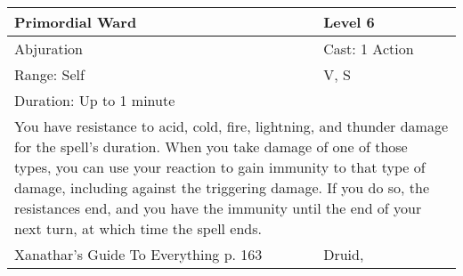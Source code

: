 \documentclass[11pt]{report}
\begin{document}
\begin{table}[H]
	\begin{tabular}{||p{6cm}|p{6cm}||}
		\hline\hline
		\bf{Primordial Ward} & Level 6\\ \hline
		Abjuration & Cast: 1 Action\\ \hline
		Range: Self & V, S\\ \hline
		Duration: Up to 1 minute & \\ \hline
		\multicolumn{2}{||p{12cm}||}{You have resistance to acid, cold, fire, lightning, and thunder damage for the spell’s duration. When you take damage of one of those types, you can use your reaction to gain immunity to that type of damage, including against the triggering damage. If you do so, the resistances end, and you have the immunity until the end of your next turn, at which time the spell ends.}\\ \hline
Xanathar's Guide To Everything p. 163 & Druid, \\ \hline\hline
	\end{tabular}
\end{table}
\end{document}
